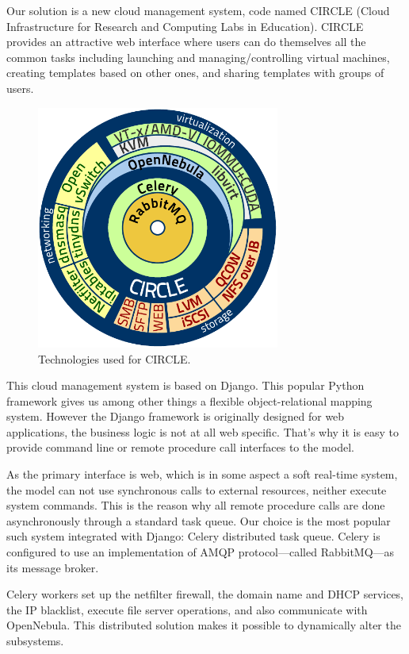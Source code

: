 \documentclass{llncs}
\begin{document}
Our solution is a new cloud management system, code named CIRCLE (Cloud Infrastructure for Research and Computing Labs in Education). CIRCLE provides an attractive web interface where users can do themselves all the common tasks including launching and managing/controlling virtual machines, creating templates based on other ones, and sharing templates with groups of users.

\begin{figure}[ht]
    \centering
    \includegraphics[width=8cm]{swarch}
    \caption{Technologies used for CIRCLE.}
\end{figure}

This cloud management system is based on Django. This popular Python framework gives us among other things a flexible object-relational mapping system. However the Django framework is originally designed for web applications, the business logic is not at all web specific. That's why it is easy to provide command line or remote procedure call interfaces to the model.

As the primary interface is web, which is in some aspect a soft real-time system, the model can not use synchronous calls to external resources, neither execute system commands. This is the reason why all remote procedure calls are done asynchronously through a standard task queue. Our choice is the most popular such system integrated with Django: Celery distributed task queue. Celery is configured to use an implementation of AMQP protocol---called RabbitMQ---as its message broker.

Celery workers set up the netfilter firewall, the domain name and DHCP services, the IP blacklist, execute file server operations, and also communicate with OpenNebula. This distributed solution makes it possible to dynamically alter the subsystems.
\end{document}
